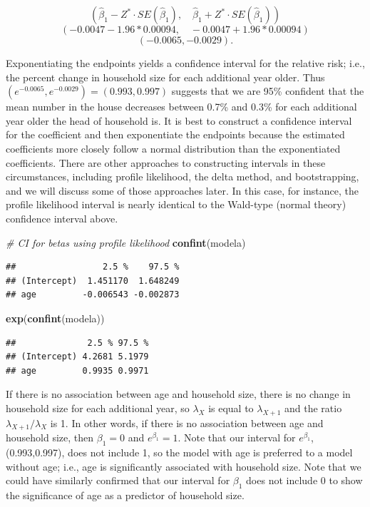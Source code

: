 \documentclass[
]{krantz}
\newenvironment{Shaded}{\begin{snugshade}}{\end{snugshade}}
\newcommand{\CommentTok}[1]{\textcolor[rgb]{0.37,0.37,0.37}{\textit{#1}}}
\newcommand{\KeywordTok}[1]{\textcolor[rgb]{0.27,0.27,0.27}{\textbf{#1}}}
\newcommand{\NormalTok}[1]{#1}
\begin{document}
\[(\hat\beta_1-Z^*\cdot SE(\hat\beta_1), \quad \hat\beta_1+Z^*\cdot SE(\hat\beta_1))\]
\[(-0.0047-1.96*0.00094, \quad -0.0047+1.96*0.00094)\]
\[ (-0.0065, -0.0029).
 \]

Exponentiating the endpoints yields a confidence interval for the relative risk; i.e., the percent change in household size for each additional year older. Thus \((e^{-0.0065},e^{-0.0029})=(0.993,0.997)\) suggests that we are 95\% confident that the mean number in the house decreases between 0.7\% and 0.3\% for each additional year older the head of household is. It is best to construct a confidence interval for the coefficient and then exponentiate the endpoints because the estimated coefficients more closely follow a normal distribution than the exponentiated coefficients. There are other approaches to constructing intervals in these circumstances, including profile likelihood, the delta method, and bootstrapping, and we will discuss some of those approaches later. In this case, for instance, the profile likelihood interval is nearly identical to the Wald-type (normal theory) confidence interval  above.

\begin{Shaded}
\begin{Highlighting}[]
\CommentTok{# CI for betas using profile likelihood}
\KeywordTok{confint}\NormalTok{(modela)}
\end{Highlighting}
\end{Shaded}

\begin{verbatim}
##                 2.5 %    97.5 %
## (Intercept)  1.451170  1.648249
## age         -0.006543 -0.002873
\end{verbatim}

\begin{Shaded}
\begin{Highlighting}[]
\KeywordTok{exp}\NormalTok{(}\KeywordTok{confint}\NormalTok{(modela))}
\end{Highlighting}
\end{Shaded}

\begin{verbatim}
##              2.5 % 97.5 %
## (Intercept) 4.2681 5.1979
## age         0.9935 0.9971
\end{verbatim}

If there is no association between age and household size, there is no change in household size for each additional year, so \(\lambda_X\) is equal to \(\lambda_{X+1}\) and the ratio \(\lambda_{X+1}/\lambda_X\) is 1. In other words, if there is no association between age and household size, then \(\beta_1=0\) and \(e^{\beta_1}=1\). Note that our interval for \(e^{\beta_1}\), (0.993,0.997), does not include 1, so the model with age is preferred to a model without age; i.e., age is significantly associated with household size. Note that we could have similarly confirmed that our interval for \(\beta_1\) does not include 0 to show the significance of age as a predictor of household size.
\end{document}
